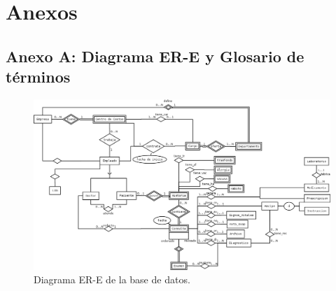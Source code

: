 \chapter*{Anexos}

\section*{Anexo A: Diagrama ER-E y Glosario de términos}
            \begin{figure}
                \begin{center}
                    \includegraphics[scale=.45,angle=90]{figures/DiagramBD}
                \end{center}
                \caption{Diagrama ER-E de la base de datos.}
            \end{figure}

\pagebreak